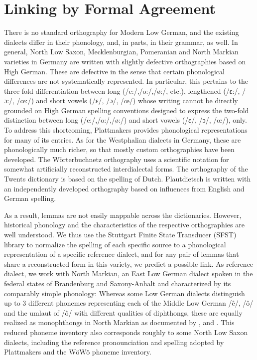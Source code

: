\section{Linking by Formal Agreement}
\label{sec-linking-by-agreement}

There is no standard orthography for Modern Low German, and the existing dialects differ in their phonology, and, in parts, in their grammar, as well.
In general, North Low Saxon, Mecklenburgian, Pomeranian and North Markian varieties in Germany are written with slightly defective orthographies based on High German. These are defective in the sense that certain phonological differences are not systematically represented. In particular, this pertains to the three-fold differentiation between long (/e:/,/o:/,/ø:/, etc.), lengthened (/ɛ:/, /ɔ:/, /œ:/) and short vowels (/ɛ/, /ɔ/, /œ/) whose writing cannot be directly grounded on High German spelling conventions designed to express the two-fold distinction between long (/e:/,/o:/,/ø:/) and short vowels (/ɛ/, /ɔ/, /œ/), only. 
To address this shortcoming, Plattmakers provides phonological representations for many of its entries. As for the Westphalian dialects in Germany, these are phonologically much richer, so that mostly custom orthographies have been developed. The Wörterbuchnetz orthography uses a scientific notation for somewhat artificially reconstructed interdialectal forms. The orthography of the Twents dictionary is based on the spelling of Dutch. Plautdietsch is written with an independently developed orthography based on influences from English and German spelling.

As a result, lemmas are not easily mappable across the dictionaries. However, historical phonology and the characteristics of the respective orthographies are well understood.
We thus use the Stuttgart Finite State Transducer (SFST) library to normalize the spelling of each specific source to a phonological representation of a specific reference dialect, and for any pair of lemmas that share a reconstructed form in this variety, we predict a possible link. 
As reference dialect, we work with North Markian, an East Low German dialect spoken in the federal states of Brandenburg and Saxony-Anhalt and characterized by its comparably simple phonology: Whereas some Low German dialects distinguish up to 3 different phonemes representing each of the Middle Low German /ê/, /ô/ and the umlaut of /ô/ with different qualities of diphthongs, these are equally realized as monophthongs in North Markian as documented by \cite{pfaff1898vocale}, \cite{mackel1905mundart} and \cite{teuchert1907mundart}. This reduced phoneme inventory also corresponds roughly to some North Low Saxon dialects, including the reference pronounciation and spelling adopted by Plattmakers and the WöWö phoneme inventory.

